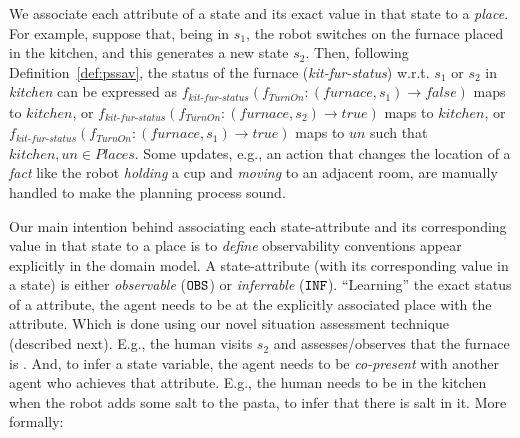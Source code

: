 \documentclass[letterpaper]{article} %
\newtheorem{definition}{Definition}
\begin{document}
We associate each attribute of a state and its exact value in that state to a \textit{place}. 
For example, suppose that, being in $s_1$, the robot switches on the furnace placed in the kitchen, and this generates a new state $s_2$. 
Then, following Definition~\ref{def:pssav}, the status of the furnace (\textit{kit-fur-status}) w.r.t. $s_1$ or $s_2$ in \textit{kitchen} can be expressed as $f_{\textit{kit-fur-status}} (f_{\textit{TurnOn}}: (\textit{furnace}, s_1) \rightarrow \textit{false})$ maps to  $kitchen$, or
$f_{\textit{kit-fur-status}} (f_{\textit{TurnOn}}: (\textit{furnace}, s_2) \rightarrow \textit{true})$ maps to $kitchen$, or 
$f_{\textit{kit-fur-status}} (f_{\textit{TurnOn}}: (\textit{furnace}, s_1) \rightarrow \textit{true})$ maps to $\mathit{un}$ such that $kitchen, \mathit{un} \in \mathit{Places}$. Some updates, e.g., an action that changes the location of a \textit{fact} like the robot \textit{holding} a cup and \textit{moving} to an adjacent room, are manually handled to make the planning process sound.




Our main intention behind associating each state-attribute and its corresponding value in that state to a place is to \textit{define} observability conventions appear explicitly in the domain model. 
A state-attribute (with its corresponding value in a state) is either \textit{observable} ($\texttt{OBS}$) or \textit{inferrable} ($\texttt{INF}$). 
``Learning'' the exact status of a attribute, the agent needs to be at the explicitly associated place with the attribute. Which is done using our novel situation assessment technique (described next). E.g., the human visits $s_2$ and assesses/observes that the furnace is {}. And, to infer a state variable, the agent needs to be \textit{co-present} with another agent who achieves that attribute. E.g., the human needs to be in the kitchen when the robot adds some salt to the pasta, to infer that there is salt in it. More formally:
\end{document}
